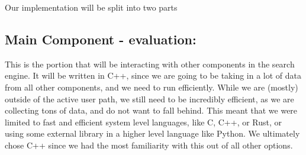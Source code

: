 Our implementation will be split into two parts

\subsection*{Main Component - evaluation:}

This is the portion that will be interacting with other components in the search engine. It will be written in C++, since we are going to be taking in a lot of data from all other components, and we need to run efficiently. While we are (mostly) outside of the active user path, we still need to be incredibly efficient, as we are collecting tons of data, and do not want to fall behind. This meant that we were limited to fast and efficient system level languages, like C, C++, or Rust, or using some external library in a higher level language like Python. We ultimately chose C++ since we had the most familiarity with this out of all other options.

\medskip

